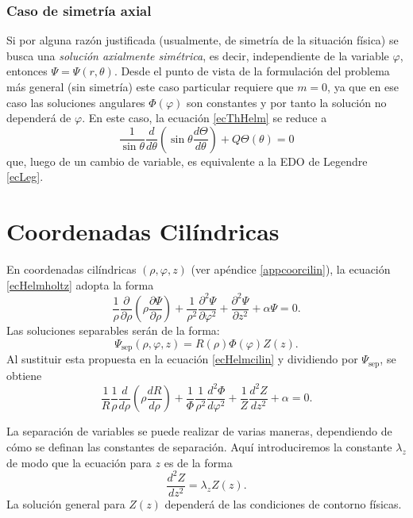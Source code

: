 \subsubsection{Caso de simetría axial}
Si por alguna razón justificada (usualmente, de simetría de la situación física) se busca una \textit{solución axialmente simétrica}, es decir, independiente de la variable $\varphi$, entonces $\Psi=\Psi(r,\theta)$. Desde el punto de vista de la formulación del problema más general (sin simetría) este caso particular requiere que $m=0$, ya que en ese caso las soluciones angulares $\Phi(\varphi)$ son constantes y por tanto la solución no dependerá de $\varphi$. En este caso, la ecuación \eqref{ecThHelm} se reduce a
\begin{equation}
    \frac{1}{\sin\theta}\frac{d}{d\theta}\left(\sin\theta\frac{d\Theta}{d\theta}\right)
    +Q\Theta(\theta) = 0
\end{equation}
que, luego de un cambio de variable, es equivalente a la EDO de Legendre \eqref{ecLeg}.


\section{Coordenadas Cilíndricas}
En coordenadas cilíndricas $(\rho, \varphi, z)$ (ver apéndice \ref{appcoorcilin}), la ecuación \eqref{ecHelmholtz} adopta la forma
\begin{equation}\label{ecHelmcilin}
\frac{1}{\rho}\frac{\partial}{\partial \rho}\left(\rho \frac{\partial \Psi}{\partial \rho}\right) + \frac{1}{\rho^2}\frac{\partial^2 \Psi}{\partial \varphi^2} + \frac{\partial^2 \Psi}{\partial z^2} + \alpha\Psi = 0.
\end{equation}
Las soluciones separables serán de la forma:
\begin{equation}
\Psi_{\text{sep}}(\rho, \varphi, z) = R(\rho)\Phi(\varphi)Z(z).
\end{equation}
Al sustituir esta propuesta en la ecuación \eqref{ecHelmcilin} y dividiendo por $\Psi_{\text{sep}}$, se obtiene
\begin{equation}\label{ecHelmcilsep}
\frac{1}{R}\frac{1}{\rho}\frac{d}{d \rho}\left(\rho \frac{dR}{d \rho}\right) + \frac{1}{\Phi}\frac{1}{\rho^2}\frac{d^2 \Phi}{d \varphi^2} + \frac{1}{Z}\frac{d^2 Z}{d z^2} + \alpha = 0.
\end{equation}

La separación de variables se puede realizar de varias maneras, dependiendo de cómo se definan las constantes de separación. Aquí introduciremos la constante $\lambda_z$ de modo que la ecuación para $z$ es de la forma
\begin{equation}
\frac{d^2 Z}{d z^2} = \lambda_z Z(z).
\end{equation}
La solución general para $Z(z)$ dependerá de las condiciones de contorno físicas.

